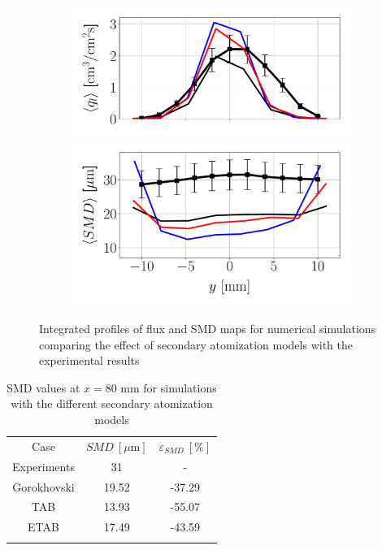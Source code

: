 \begin{figure}[h!]
\begin{subfigure}[b]{0.2\textwidth}
\end{subfigure}
\hspace*{0.1in}
\begin{subfigure}[b]{0.4\textwidth}
	\flushleft
   \includegraphics[scale=0.35]{./part2_developments/figures_ch6_lagrangian_JICF/params_breakup_model/profiles/flux_along_y}\\
   \vspace{-0.16in}
   \includegraphics[scale=0.35]{./part2_developments/figures_ch6_lagrangian_JICF/params_breakup_model/profiles/SMD_along_y}
\end{subfigure}

\caption{Integrated profiles of flux and SMD maps for numerical simulations comparing the effect of secondary atomization models with the experimental results}
\label{fig:profiles_LGS_JICF_secondary_atom_model}
\end{figure}



\begin{table}[!h]
\centering
\caption{SMD values at $x = 80$ mm for simulations with the different secondary atomization models}
\begin{tabular}{ccc}
\thickhline
Case & $SMD~\left[\mu \mathrm{m} \right]$ & $\varepsilon_{SMD}~\left[\% \right]$ \\
\thickhline
Experiments & 31 & - \\
Gorokhovski & 19.52 & -37.29 \\
TAB & 13.93 & -55.07 \\
ETAB & 17.49 & -43.59 \\
\thickhline
\end{tabular}
\label{tab:SMD_deviations_turb_inj}
\end{table}

